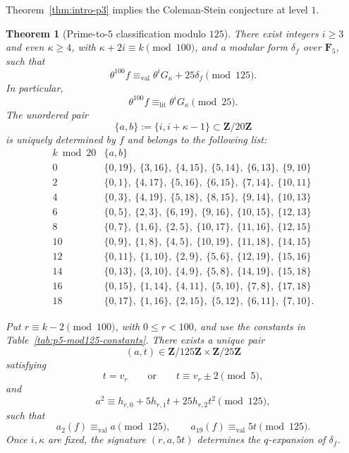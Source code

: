 \documentclass[11pt]{article}
\theoremstyle{plain}
\newtheorem{theorem}{Theorem}[section]
\theoremstyle{definition}
\theoremstyle{remark}
\numberwithin{equation}{section}
\begin{document}
Theorem~\ref{thm:intro-p3} implies the Coleman-Stein conjecture at level $1$. 

\begin{theorem}[Prime-to-\(5\) classification modulo \(125\)] \label{thm:intro-p5} There exist integers \(i\geq3\) and even \(\kappa\geq4\), with \(\kappa+2i\equiv k\pmod{100}\), and a modular form \(\delta_f\) over \(\mathbf F_5\), such that \[ \theta^{100}f \equiv_{\mathrm{val}} \theta^iG_\kappa+25\delta_f\pmod{125}. \] In particular, \[ \theta^{100}f\equiv_{\mathrm{lit}}\theta^iG_\kappa\pmod{25}. \] The unordered pair \[ \{a,b\}:=\{i,i+\kappa-1\}\subset\mathbf Z/20\mathbf Z \] is uniquely determined by \(f\) and belongs to the following list:
\[
\begin{array}{c|l}
k\bmod20 & \{a,b\}\\ \hline
0  & \{0,19\},\ \{3,16\},\ \{4,15\},\
     \{5,14\},\ \{6,13\},\ \{9,10\}\\
2  & \{0,1\},\ \{4,17\},\ \{5,16\},\
     \{6,15\},\ \{7,14\},\ \{10,11\}\\
4  & \{0,3\},\ \{4,19\},\ \{5,18\},\
     \{8,15\},\ \{9,14\},\ \{10,13\}\\
6  & \{0,5\},\ \{2,3\},\ \{6,19\},\
     \{9,16\},\ \{10,15\},\ \{12,13\}\\
8  & \{0,7\},\ \{1,6\},\ \{2,5\},\
     \{10,17\},\ \{11,16\},\ \{12,15\}\\
10 & \{0,9\},\ \{1,8\},\ \{4,5\},\
     \{10,19\},\ \{11,18\},\ \{14,15\}\\
12 & \{0,11\},\ \{1,10\},\ \{2,9\},\
     \{5,6\},\ \{12,19\},\ \{15,16\}\\
14 & \{0,13\},\ \{3,10\},\ \{4,9\},\
     \{5,8\},\ \{14,19\},\ \{15,18\}\\
16 & \{0,15\},\ \{1,14\},\ \{4,11\},\
     \{5,10\},\ \{7,8\},\ \{17,18\}\\
18 & \{0,17\},\ \{1,16\},\ \{2,15\},\
     \{5,12\},\ \{6,11\},\ \{7,10\}.
\end{array}
\]

Put \(r\equiv k-2\pmod{100}\), with \(0\leq r<100\), and use the constants in Table~\ref{tab:p5-mod125-constants}. There exists a unique pair \[ (a,t)\in\mathbf Z/125\mathbf Z\times\mathbf Z/25\mathbf Z \] satisfying \[ t=v_r\qquad\text{or}\qquad t\equiv v_r\pm2\pmod5, \] and \[ a^2\equiv h_{r,0}+5h_{r,1}t+25h_{r,2}t^2\pmod{125}, \] such that \[ a_2(f)\equiv_{\mathrm{val}}a\pmod{125}, \qquad a_{19}(f)\equiv_{\mathrm{val}}5t\pmod{125}. \] Once \(i,\kappa\) are fixed, the signature \((r,a,5t)\) determines the \(q\)-expansion of \(\delta_f\).


\end{theorem}
\end{document}
